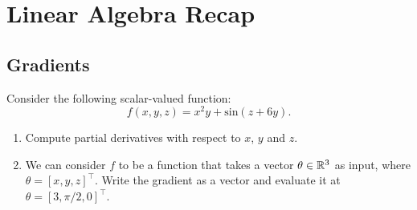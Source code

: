 \clearpage

\section{Linear Algebra Recap}
\subsection{Gradients}
Consider the following scalar-valued function: 
$$
    f(x, y, z) = x^2y + \text{sin}(z+6y). 
$$

\begin{enumerate}
    \item Compute partial derivatives with respect to $x$, $y$ and $z$. \\
    
    \item We can consider $f$ to be a function that takes a vector $\theta \in \mathbb{R}^3$ as input, where $\theta = [x, y, z]^\top$. 
    Write the gradient as a vector and evaluate it at $\theta = [3, \pi/2, 0]^\top$.\\
    \solution{\[
    \nabla f(3, \pi/2, 0)  =
    \begin{bmatrix}
    2(3)(\pi/2) \\
    3^2 + 6\cos(0 + 6(\pi/2) \\
    \cos(0 + 6(\pi/2)
    \end{bmatrix}
    \rightarrow
    \begin{bmatrix}
    3\pi \\
    3 \\
    -1
    \end{bmatrix}
    \]}
\end{enumerate}



